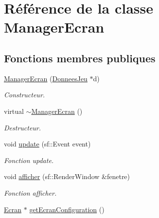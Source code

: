 \hypertarget{classManagerEcran}{\section{\-Référence de la classe \-Manager\-Ecran}
\label{classManagerEcran}
}
\subsection*{\-Fonctions membres publiques}
\begin{DoxyCompactItemize}
\item 
\hypertarget{classManagerEcran_ad9e96d0c51dc6c866eca240f2db1cc88}{\hyperlink{classManagerEcran_ad9e96d0c51dc6c866eca240f2db1cc88}{\-Manager\-Ecran} (\hyperlink{classDonneesJeu}{\-Donnees\-Jeu} $\ast$d)}\label{classManagerEcran_ad9e96d0c51dc6c866eca240f2db1cc88}

\begin{DoxyCompactList}\small\item\em \-Constructeur. \end{DoxyCompactList}\item 
\hypertarget{classManagerEcran_a9faf6ff983828f67ba4e0b4c319a3d7e}{virtual \hyperlink{classManagerEcran_a9faf6ff983828f67ba4e0b4c319a3d7e}{$\sim$\-Manager\-Ecran} ()}\label{classManagerEcran_a9faf6ff983828f67ba4e0b4c319a3d7e}

\begin{DoxyCompactList}\small\item\em \-Destructeur. \end{DoxyCompactList}\item 
\hypertarget{classManagerEcran_a2e47bdd001da8f6102e3ce0775d5f401}{void \hyperlink{classManagerEcran_a2e47bdd001da8f6102e3ce0775d5f401}{update} (sf\-::\-Event event)}\label{classManagerEcran_a2e47bdd001da8f6102e3ce0775d5f401}

\begin{DoxyCompactList}\small\item\em \-Fonction update. \end{DoxyCompactList}\item 
\hypertarget{classManagerEcran_a522b604974166e41863717e6abdc31a1}{void \hyperlink{classManagerEcran_a522b604974166e41863717e6abdc31a1}{afficher} (sf\-::\-Render\-Window \&fenetre)}\label{classManagerEcran_a522b604974166e41863717e6abdc31a1}

\begin{DoxyCompactList}\small\item\em \-Fonction afficher. \end{DoxyCompactList}\item 
\hypertarget{classManagerEcran_a1168854592f21f73624fa87fe839e188}{\hyperlink{classEcran}{\-Ecran} $\ast$ \hyperlink{classManagerEcran_a1168854592f21f73624fa87fe839e188}{get\-Ecran\-Configuration} ()}\label{classManagerEcran_a1168854592f21f73624fa87fe839e188}


\end{DoxyCompactItemize}
